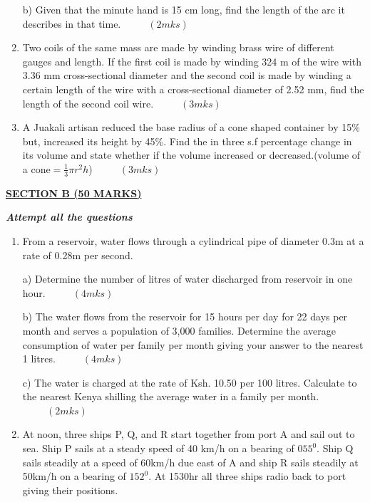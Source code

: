 \documentclass[
  a4paperpaper,
]{scrbook}
\begin{document}
\begin{tcolorbox}
\begin{enumerate}
  b) Given that the minute hand is 15 cm long, find the length of the
  arc it describes in that time. \(\hspace{1cm} (2mks)\)
\item
  Two coils of the same mass are made by winding brass wire of different
  gauges and length. If the first coil is made by winding 324 m of the
  wire with 3.36 mm cross-sectional diameter and the second coil is made
  by winding a certain length of the wire with a cross-sectional
  diameter of 2.52 mm, find the length of the second coil wire.
  \(\hspace{1cm} (3mks)\)
\item
  A Juakali artisan reduced the base radius of a cone shaped container
  by 15\% but, increased its height by 45\%. Find the in three s.f
  percentage change in its volume and state whether if the volume
  increased or decreased.(volume of a cone\(=\frac{1}{3}\pi r^2h\))
  \(\hspace{1cm} (3mks)\)
\end{enumerate}

\ul{\textbf{SECTION B (50 MARKS)}}

\textbf{\emph{Attempt all the questions}}

\begin{enumerate}
\def\labelenumi{\arabic{enumi}.}
\setcounter{enumi}{16}
\item
  From a reservoir, water flows through a cylindrical pipe of diameter
  0.3m at a rate of 0.28m per second.

  a) Determine the number of litres of water discharged from reservoir
  in one hour. \(\hspace{1cm} (4mks)\)

  b) The water flows from the reservoir for 15 hours per day for 22 days
  per month and serves a population of 3,000 families. Determine the
  average consumption of water per family per month giving your answer
  to the nearest 1 litres. \(\hspace{1cm} (4mks)\)

  c) The water is charged at the rate of Ksh. 10.50 per 100 litres.
  Calculate to the nearest Kenya shilling the average water in a family
  per month. \(\hspace{1cm} (2mks)\)
\item
  At noon, three ships P, Q, and R start together from port A and sail
  out to sea. Ship P sails at a steady speed of 40 km/h on a bearing of
  \(055^0\). Ship Q sails steadily at a speed of 60km/h due east of A
  and ship R sails steadily at 50km/h on a bearing of \(152^0\). At
  1530hr all three ships radio back to port giving their positions.


\end{enumerate}
\end{tcolorbox}
\end{document}

